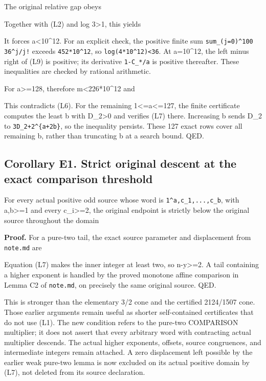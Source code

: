 The original relative gap obeys


Together with (L2) and log 3\textgreater1, this yields


It forces a\textless10\^{}12. For an explicit check, the positive finite
sum \nolinkurl{sum_(j=0)^100 36^j/j!} exceeds \nolinkurl{452*10^12}, so
\nolinkurl{log(4*10^12)<36}. At a=10\^{}12, the left minus right of (L9)
is positive; its derivative \nolinkurl{1-C_*/a} is positive thereafter.
These inequalities are checked by rational arithmetic.

For a\textgreater=128, therefore m\textless226*10\^{}12 and


This contradicts (L6). For the remaining 1\textless=a\textless=127, the
finite certificate computes the least b with D\_2\textgreater0 and
verifies (L7) there. Increasing b sends D\_2 to
\texttt{3D\_2+2\^{}\{a+2b\}}, so the inequality persists. These 127
exact rows cover all remaining b, rather than truncating b at a search
bound. QED.

\subsection{Corollary E1. Strict original descent at the exact
comparison threshold}

For every actual positive odd source whose word is
\nolinkurl{1^a,c_1,...,c_b}, with a,b\textgreater=1 and every
c\_i\textgreater=2, the original endpoint is strictly below the original
source throughout the domain


\textbf{Proof.} For a pure-two tail, the exact source parameter and
displacement from \nolinkurl{note.md} are


Equation (L7) makes the inner integer at least two, so
n-y\textgreater=2. A tail containing a higher exponent is handled by the
proved monotone affine comparison in Lemma C2 of \nolinkurl{note.md}, on
precisely the same original source. QED.

This is stronger than the elementary 3/2 cone and the certified
2124/1507 cone. Those earlier arguments remain useful as shorter
self-contained certificates that do not use (L1). The new condition
refers to the pure-two COMPARISON multiplier; it does not assert that
every arbitrary word with contracting actual multiplier descends. The
actual higher exponents, offsets, source congruences, and intermediate
integers remain attached. A zero displacement left possible by the
earlier weak pure-two lemma is now excluded on its actual positive
domain by (L7), not deleted from its source declaration.

